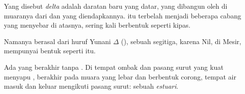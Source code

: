 \begin{definition}[Delta]\label{def:g5:water-shapes-the-land:delta}
Yang disebut \emph{delta} adalah daratan baru yang datar, yang
dibangun oleh  di muaranya dari  dan  yang diendapkannya.
 itu terbelah menjadi beberapa cabang yang menyebar di atasnya,
sering kali berbentuk seperti kipas.
\end{definition}

Namanya berasal dari huruf Yunani $\Delta$ (), sebuah segitiga, karena
  Nil, di Mesir, mempunyai bentuk seperti itu.

Ada  yang berakhir tanpa . Di tempat ombak dan pasang surut yang
kuat menyapu ,  berakhir pada muara yang lebar dan berbentuk
corong, tempat air  masuk dan keluar mengikuti pasang surut: sebuah
\emph{estuari}.

